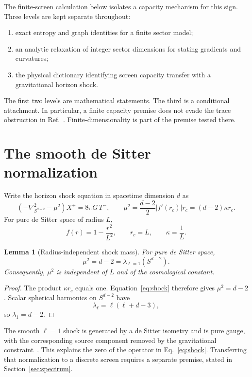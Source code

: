 \documentclass[11pt]{article}
\newtheorem{lemma}[theorem]{Lemma}
\theoremstyle{remark}
\begin{document}
The finite-screen calculation below isolates a capacity mechanism for this
sign. Three levels are kept separate throughout:
\begin{enumerate}
\item exact entropy and graph identities for a finite sector model;
\item an analytic relaxation of integer sector dimensions for stating
gradients and curvatures;
\item the physical dictionary identifying screen capacity transfer with a
gravitational horizon shock.
\end{enumerate}
The first two levels are mathematical statements. The third is a conditional
attachment. In particular, a finite capacity premise does not evade the trace
obstruction in Ref.~\cite{chenStanfordTangYang2026}. Finite-dimensionality is
part of the premise tested there.

\section{The smooth de Sitter normalization}

Write the horizon shock equation in spacetime dimension \(d\) as
\begin{equation}
\left(-\nabla^2_{S^{d-2}}-\mu^2\right)X^+
=8\pi G\,T^-,
\qquad
\mu^2=\frac{d-2}{2}|f'(r_c)|r_c=(d-2)\kappa r_c .
\label{eq:shock}
\end{equation}
For pure de Sitter space of radius \(L\),
\[
f(r)=1-\frac{r^2}{L^2},
\qquad
r_c=L,
\qquad
\kappa=\frac1L.
\]

\begin{lemma}[Radius-independent shock mass]
\label{lem:mu2}
For pure de Sitter space,
\[
\mu^2=d-2=\lambda_{\ell=1}\!\left(S^{d-2}\right).
\]
Consequently, \(\mu^2\) is independent of \(L\) and of the cosmological
constant.
\end{lemma}

\begin{proof}
The product \(\kappa r_c\) equals one. Equation~\eqref{eq:shock} therefore
gives \(\mu^2=d-2\). Scalar spherical harmonics on \(S^{d-2}\) have
\[
\lambda_\ell=\ell(\ell+d-3),
\]
so \(\lambda_1=d-2\).
\end{proof}

The smooth \(\ell=1\) shock is generated by a de Sitter isometry and is pure
gauge, with the corresponding source component removed by the gravitational
constraint~\cite{chenStanfordTangYang2026}. This explains the zero of the
operator in Eq.~\eqref{eq:shock}. Transferring that normalization to a
discrete screen requires a separate premise, stated in
Section~\ref{sec:spectrum}.
\end{document}
